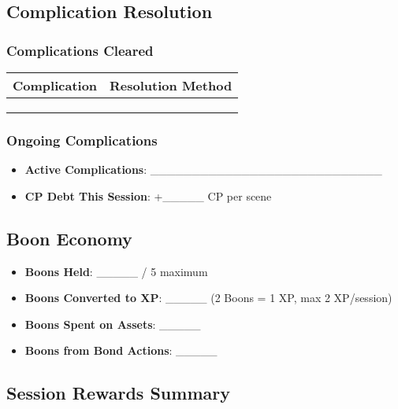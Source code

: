\subsection{Complication Resolution}

\subsubsection{Complications Cleared}
\begin{tabular}{|p{5cm}|p{5cm}|}
\hline
\textbf{Complication} & \textbf{Resolution Method} \\
\hline
& \\
& \\
& \\
\hline
\end{tabular}

\subsubsection{Ongoing Complications}
\begin{itemize}
    \item \textbf{Active Complications}: \_\_\_\_\_\_\_\_\_\_\_\_\_\_\_\_\_\_\_\_\_\_\_\_\_\_\_\_
    \item \textbf{CP Debt This Session}: +\_\_\_\_\_ CP per scene
\end{itemize}

\subsection{Boon Economy}

\begin{itemize}
    \item \textbf{Boons Held}: \_\_\_\_\_ / 5 maximum
    \item \textbf{Boons Converted to XP}: \_\_\_\_\_ (2 Boons = 1 XP, max 2 XP/session)
    \item \textbf{Boons Spent on Assets}: \_\_\_\_\_
    \item \textbf{Boons from Bond Actions}: \_\_\_\_\_
\end{itemize}

\subsection{Session Rewards Summary}

